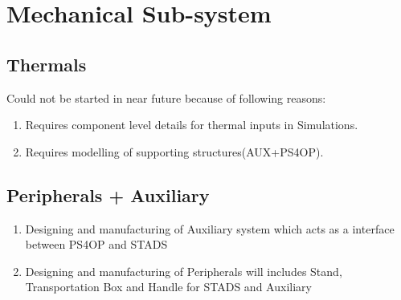 \documentclass[../../main.tex]{subfiles}
\begin{document}
\chapter{Mechanical Sub-system}
\thispagestyle{fancy}

%
%
%
%








\section{Thermals}
\text Could not be started in near future because of following reasons:
\begin{enumerate}
    \item Requires component level details for thermal inputs in Simulations.
    \item Requires modelling of supporting structures(AUX+PS4OP).
\end{enumerate}

\newpage


\section{Peripherals + Auxiliary} 
\begin{enumerate}
    \item Designing and manufacturing of Auxiliary system which acts as a interface between PS4OP and STADS
    \item Designing and manufacturing of Peripherals will includes Stand, Transportation Box and Handle for STADS and Auxiliary
\end{enumerate}
\end{document}
